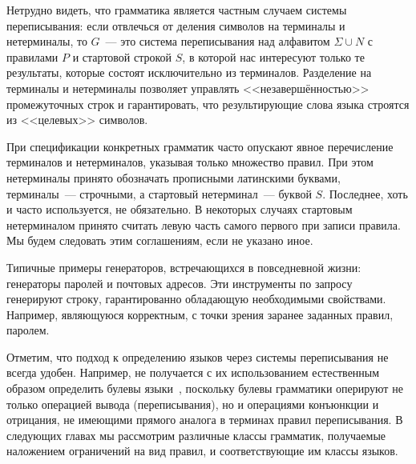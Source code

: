 Нетрудно видеть, что грамматика является частным случаем системы переписывания: если отвлечься от деления символов на терминалы и нетерминалы, то $G$~--- это система переписывания над алфавитом $\Sigma \cup N$ с правилами $P$ и стартовой строкой $S$, в которой нас интересуют только те результаты, которые состоят исключительно из терминалов.
Разделение на терминалы и нетерминалы позволяет управлять <<незавершённостью>> промежуточных строк и гарантировать, что результирующие слова языка строятся из <<целевых>> символов.

При спецификации конкретных грамматик часто опускают явное перечисление терминалов и нетерминалов, указывая только множество правил.
При этом нетерминалы принято обозначать прописными латинскими буквами, терминалы~--- строчными, а стартовый нетерминал~--- буквой $S$. Последнее, хоть и часто используется, не обязательно. В некоторых случаях стартовым нетерминалом принято считать левую часть самого первого при записи правила.
Мы будем следовать этим соглашениям, если не указано иное.

Типичные примеры генераторов, встречающихся в повседневной жизни: генераторы паролей и почтовых адресов.
Эти инструменты по запросу генерируют строку, гарантированно%
обладающую необходимыми свойствами. Например, являющуюся корректным, с точки зрения заранее заданных правил, паролем.

Отметим, что подход к определению языков через системы переписывания не всегда удобен.
Например, не получается с их использованием естественным образом определить булевы языки~, поскольку булевы грамматики оперируют не только операцией вывода (переписывания), но и операциями конъюнкции и отрицания, не имеющими прямого аналога в терминах правил переписывания.
В следующих главах мы рассмотрим различные классы грамматик, получаемые наложением ограничений на вид правил, и соответствующие им классы языков.
